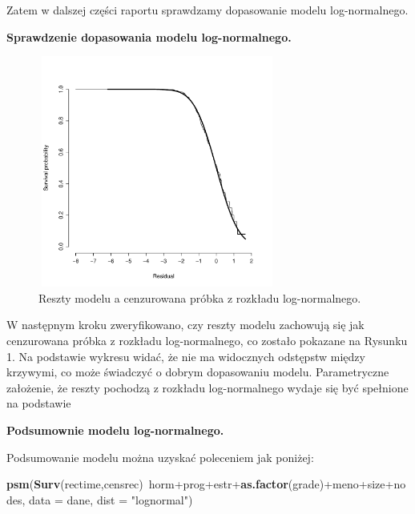 \documentclass[]{article}
\newenvironment{Shaded}{}{}
\newcommand{\KeywordTok}[1]{\textcolor[rgb]{0.00,0.44,0.13}{\textbf{{#1}}}}
\newcommand{\DataTypeTok}[1]{\textcolor[rgb]{0.56,0.13,0.00}{{#1}}}
\newcommand{\StringTok}[1]{\textcolor[rgb]{0.25,0.44,0.63}{{#1}}}
\newcommand{\NormalTok}[1]{{#1}}
\begin{document}
Zatem w dalszej części raportu sprawdzamy dopasowanie modelu
log-normalnego.

\textbf{Sprawdzenie dopasowania modelu log-normalnego.}

\begin{figure}[hbt!]
  \vspace{-20pt}
  \begin{center}
     \includegraphics[width=0.7\textwidth, height=3in]{lognormal.pdf}
  \end{center}
  \vspace{-20pt}
  \label{fig:sc}
  \caption{Reszty modelu a cenzurowana próbka z rozkładu log-normalnego.}

\end{figure}

W następnym kroku zweryfikowano, czy reszty modelu zachowują się jak
cenzurowana próbka z rozkładu log-normalnego, co zostało pokazane na
Rysunku 1. Na podstawie wykresu widać, że nie ma widocznych odstępstw
między krzywymi, co może świadczyć o dobrym dopasowaniu modelu.
Parametryczne założenie, że reszty pochodzą z rozkładu log-normalnego
wydaje się być spełnione na podstawie 

\textbf{ Podsumownie modelu log-normalnego.}

Podsumowanie modelu można uzyskać poleceniem jak poniżej:

\begin{Shaded}
\begin{Highlighting}[]
\KeywordTok{psm}\NormalTok{(}\KeywordTok{Surv}\NormalTok{(rectime,censrec)~horm+prog+estr+}\KeywordTok{as.factor}\NormalTok{(grade)+meno+size+nodes, }
        \DataTypeTok{data =} \NormalTok{dane, }\DataTypeTok{dist =} \StringTok{"lognormal"}\NormalTok{)}
\end{Highlighting}
\end{Shaded}
\end{document}
